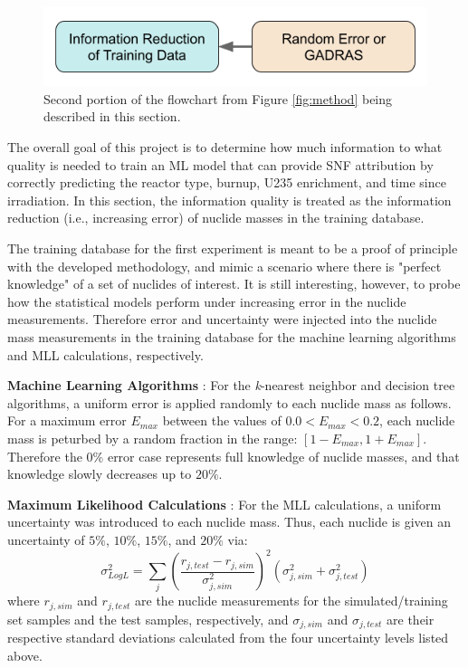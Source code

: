 \begin{figure}[H]
  \centering
  \includegraphics[width=0.7\linewidth]{./chapters/exp1/methodology2.png}
  \caption{Second portion of the flowchart from Figure \ref{fig:method} being 
           described in this section.}
\end{figure}

The overall goal of this project is to determine how much information to what
quality is needed to train an \gls{ML} model that can provide \gls{SNF}
attribution by correctly predicting the reactor type, burnup, \gls{U235}
enrichment, and time since irradiation.  In this section, the information
quality is treated as the information reduction (i.e., increasing error) of
nuclide masses in the training database. 

The training database for the first experiment is meant to be a proof of
principle with the developed methodology, and mimic a scenario where there is
"perfect knowledge" of a set of nuclides of interest. It is still interesting,
however, to probe how the statistical models perform under increasing error in
the nuclide measurements. Therefore error and uncertainty were injected into
the nuclide mass measurements in the training database for the machine learning
algorithms and \gls{MLL} calculations, respectively. 

\noindent \textbf{Machine Learning Algorithms} : For the \textit{k}-nearest
neighbor and decision tree algorithms, a uniform error is applied randomly to
each nuclide mass as follows.  For a maximum error $E_{max}$ between the values
of $0.0 < E_{max} < 0.2$, each nuclide mass is peturbed by a random fraction in
the range: $[1-E_{max},1+E_{max}]$.  Therefore the $0\%$ error case represents
full knowledge of nuclide masses, and that knowledge slowly decreases up to
$20\%$. 

\noindent \textbf{Maximum Likelihood Calculations} : For the \gls{MLL}
calculations, a uniform uncertainty was introduced to each nuclide mass.  Thus,
each nuclide is given an uncertainty of $5\%$, $10\%$, $15\%$, and $20\%$
via:
\begin{equation}
  \label{eq:mllunc}
  \sigma_{Log L}^2 = \sum_j \left( 
                            \frac{r_{j,test} - r_{j,sim}}{\sigma_{j,sim}^2}
                            \right)^2 
                            (\sigma_{j,sim}^2 + \sigma_{j,test}^2)
\end{equation}
where $r_{j,sim}$ and $r_{j,test}$ are the nuclide measurements for the
simulated/training set samples and the test samples, respectively, and
$\sigma_{j,sim}$ and $\sigma_{j,test}$ are their respective standard
deviations calculated from the four uncertainty levels listed above.

